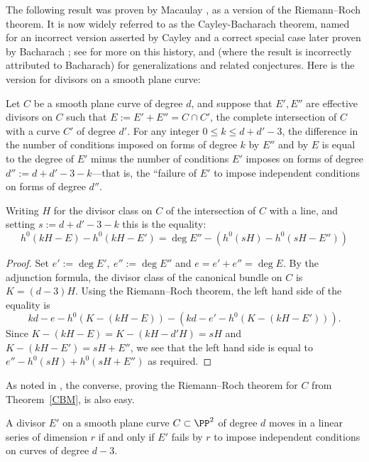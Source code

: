 The following result was proven by Macaulay \cite[p.~424]{Macaulay1900}, as a version of the Riemann--Roch theorem. It is now widely referred to as the Cayley-Bacharach theorem, named for an
incorrect version asserted by Cayley and a correct special case later proven by 
Bacharach\cite{Bacharach1886}
; see \cite[Section 2.3]{eisenbud-gray} for more on this history, and 
\cite{MR1376653} (where the result is incorrectly attributed to Bacharach) for generalizations and related conjectures. Here is the version for divisors on a smooth plane curve:

\begin{theorem}\label{CBM} Let $C$ be a smooth plane curve of degree $d$, and suppose that
$E', E''$ are effective divisors on $C$ such that $E:=E'+E'' = C\cap C'$, the complete intersection of $C$
with a curve $C'$ of degree $d'$. For any integer $0\leq k \leq d+d'-3$, the difference in the number of conditions imposed 
on forms of degree $k$ by $E''$ and by $E$ is equal to the degree of $E'$ minus the
number of conditions $E'$ imposes on forms of degree $d'':=d+d'-3 -k$---that is, the ``failure of
$E'$ to impose independent conditions on forms of degree $d''$.

 Writing $H$ for
the divisor class on $C$ of the intersection of $C$ with a line, and setting $s := d+d'-3-k$ this is the equality:
$$
h^0(kH-E) - h^0(kH-E')  = \deg E'' - \left(h^0(sH) -  h^0(sH-E'')\right)
$$
\end{theorem}

\begin{proof}
Set $e' := \deg E', \ e'':= \deg E''$ and $e = e'+e'' = \deg E.$
By the adjunction formula, the divisor class of the canonical bundle on $C$ is $K = (d-3)H$. Using the Riemann--Roch theorem, the left hand side of the equality is
$$
kd-e-h^0(K - (kH-E)) - \left(kd-e' - h^0(K-(kH-E'))\right).
$$
Since $K - (kH-E) = K - (kH-d'H) = sH$ and  $K-(kH-E') = sH+E''$, we see that the 
left hand side is equal to 
$
e'' - h^0(sH) +  h^0(sH+E'')
$
as required.
\end{proof}

As noted in \cite{eisenbud-gray}, the converse, proving the Riemann--Roch theorem for $C$ from Theorem~\ref{CBM}, is also easy.

\begin{corollary}\label{CBM cor 1}
A divisor $E'$ on a smooth plane curve $C\subset \PP^2$ of degree $d$ moves
in a linear series of dimension $r$ if and only if $E'$ fails by $r$ to impose
independent conditions on curves of degree $d-3$.
\end{corollary}

